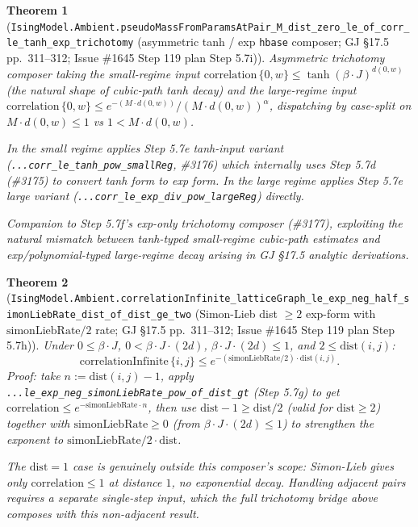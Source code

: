 \documentclass[a4paper,11pt]{article}
\newtheorem{theorem}{Theorem}
\begin{document}
\begin{theorem}[\texttt{IsingModel.Ambient.pseudoMassFromParamsAtPair\_M\_dist\_zero\_le\_of\_corr\_le\_tanh\_exp\_trichotomy}
(asymmetric tanh / exp \texttt{hbase} composer;
GJ \S17.5 pp.~311--312; Issue \#1645 Step 119 plan Step 5.7i)]
Asymmetric trichotomy composer taking the small-regime input
$\mathrm{correlation}\,\{0,w\} \le \tanh(\beta\cdot J)^{d(0,w)}$ (the
natural shape of cubic-path tanh decay) and the large-regime input
$\mathrm{correlation}\,\{0,w\} \le e^{-(M\cdot d(0,w))} / (M\cdot d(0,w))^\alpha$,
dispatching by case-split on $M\cdot d(0,w) \le 1$ vs $1 < M\cdot d(0,w)$.

In the small regime applies Step 5.7e tanh-input variant
(\texttt{...corr\_le\_tanh\_pow\_smallReg}, \#3176) which internally uses
Step 5.7d (\#3175) to convert tanh form to exp form. In the large regime
applies Step 5.7e large variant
(\texttt{...corr\_le\_exp\_div\_pow\_largeReg}) directly.

Companion to Step 5.7f's exp-only trichotomy composer (\#3177), exploiting
the natural mismatch between tanh-typed small-regime cubic-path estimates
and exp/polynomial-typed large-regime decay arising in GJ \S17.5 analytic
derivations.
\end{theorem}

\begin{theorem}[\texttt{IsingModel.Ambient.correlationInfinite\_latticeGraph\_le\_exp\_neg\_half\_simonLiebRate\_dist\_of\_dist\_ge\_two}
(Simon-Lieb dist $\ge 2$ exp-form with $\mathrm{simonLiebRate}/2$ rate;
GJ \S17.5 pp.~311--312; Issue \#1645 Step 119 plan Step 5.7h)]
Under $0 \le \beta\cdot J$, $0 < \beta\cdot J\cdot(2d)$,
$\beta\cdot J\cdot(2d) \le 1$, and $2 \le \mathrm{dist}(i, j)$:
\[
  \mathrm{correlationInfinite}\,\{i, j\}
    \le e^{-(\mathrm{simonLiebRate}/2)\cdot \mathrm{dist}(i, j)}.
\]
Proof: take $n := \mathrm{dist}(i, j) - 1$, apply
\texttt{...le\_exp\_neg\_simonLiebRate\_pow\_of\_dist\_gt} (Step 5.7g) to
get $\mathrm{correlation} \le e^{-\mathrm{simonLiebRate}\cdot n}$, then use
$\mathrm{dist} - 1 \ge \mathrm{dist}/2$ (valid for $\mathrm{dist} \ge 2$)
together with $\mathrm{simonLiebRate} \ge 0$ (from $\beta\cdot J\cdot(2d) \le 1$) to
strengthen the exponent to $\mathrm{simonLiebRate}/2 \cdot \mathrm{dist}$.

The $\mathrm{dist} = 1$ case is genuinely outside this composer's scope:
Simon-Lieb gives only $\mathrm{correlation} \le 1$ at distance $1$, no
exponential decay. Handling adjacent pairs requires a separate single-step
input, which the full trichotomy bridge above composes with this non-adjacent
result.
\end{theorem}
\end{document}
